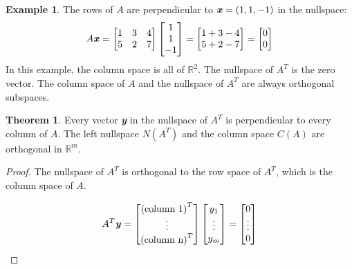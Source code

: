 \documentclass[12pt, letterpaper]{article}
\newcommand{\R}[1]{$\mathbb{R}^{#1}$}
\newcommand{\V}[1]{\textbf{\textit{#1}}}
\theoremstyle{definition}
\newtheorem{example}{Example}
\newtheorem{theorem}{Theorem}
\begin{document}
	\begin{example}
		The rows of $A$ are perpendicular to $\V{x} = (1,1,-1)$ in the nullspace:
		\begin{gather*}
			A\V{x} = \begin{bmatrix} 1&3&4 \\ 5&2&7\end{bmatrix} \begin{bmatrix} 1 \\ 1 \\ -1 \end{bmatrix} = \begin{bmatrix} 1+3-4 \\ 5+2-7 \end{bmatrix} = \begin{bmatrix} 0\\ 0 \end{bmatrix}
		\end{gather*}
		In this example, the column space is all of \R{2}. The nullspace of $A^T$ is the zero vector. The column space of $A$ and the nullspace of $A^T$ are always orthogonal subspaces.
	\end{example}


	\begin{theorem}
		Every vector \V{y} in the nullspace of $A^T$ is perpendicular to every column of $A$. The left nullspace $N(A^T)$ and the column space $C(A)$ are orthogonal in \R{m}.
	\end{theorem}

	\begin{proof}
		The nullspace of $A^T$ is orthogonal to the row space of $A^T$, which is the column space of $A$.
		
		\begin{gather*}
			A^T\V{y} = \begin{bmatrix} \text{(column 1)}^T \\ \vdots \\ \text{(column n)}^T \end{bmatrix} \begin{bmatrix} y_1 \\ \vdots \\ y_m \end{bmatrix} = \begin{bmatrix} 0 \\ \vdots \\ 0 \end{bmatrix}
		\end{gather*}
	\end{proof}
	
\end{document}
